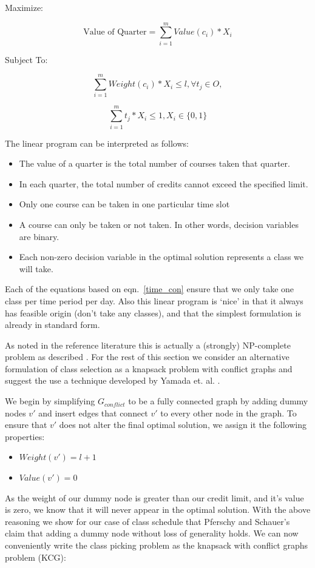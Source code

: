 \documentclass[11pt]{article} %
\begin{document}
Maximize: 

\begin{equation}
    \text{Value of Quarter} = \sum_{i=1}^m Value(c_i) * X_i
    \label{qtr_val}
\end{equation}

Subject To: 

\begin{equation}
    \sum_{i=1}^m Weight(c_i) * X_i \leq l, \forall t_j \in O,
    \label{weight_lim}
\end{equation}

\begin{equation}
    \sum_{i=1}^m t_j * X_i \leq 1, X_i \in \{0, 1\}
    \label{time_con}
\end{equation}

The linear program
can be interpreted as follows: \begin{itemize} \item The value of a quarter is
the total number of courses taken that quarter.  \item In each quarter, the
total number of credits cannot exceed the specified limit.  \item Only one
course can be taken in one particular time slot \item A course can only be taken
or not taken. In other words, decision variables are binary.  \item Each
non-zero decision variable in the optimal solution represents a class we will
take.  \end{itemize}

Each of the equations based on eqn.~\ref{time_con} ensure that we only take one class per 
time period per day. Also this linear program is ‘nice’ in that it always has 
feasible origin (don’t take any classes), and that the simplest formulation 
is already in standard form.

As noted in the reference literature this is actually a (strongly) NP-complete
problem as described \cite{pferschy:kcg}. For the rest of this section we
consider an alternative formulation of class selection as a knapsack problem
with conflict graphs and suggest the use a technique developed by Yamada et. al.
\cite{yamada:heuristic}.

We begin by simplifying $G_{conflict}$ to be a fully connected graph by adding
dummy nodes $v'$ and insert edges that connect $v'$ to every other node in the
graph. To ensure that $v'$ does not alter the final optimal solution, we assign
it the following properties: \begin{itemize} \item $Weight(v') = l+1$ \item
$Value(v') = 0$ \end{itemize} As the weight of our dummy node is greater than
our credit limit, and it's value is zero, we know that it will never appear in
the optimal solution. With the above reasoning we show for our case of class
schedule that Pferschy and Schauer's \cite{pferschy:kcg} claim that adding
a dummy node without loss of generality holds. We can now conveniently write the
class picking problem as the knapsack with conflict graphs problem (KCG): 
\end{document}

